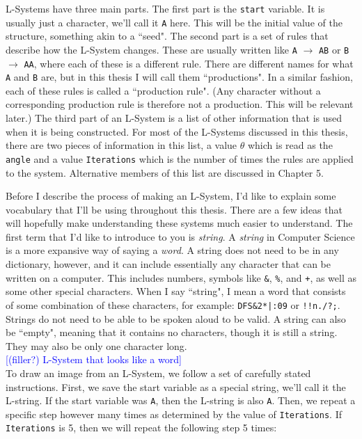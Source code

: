 \documentclass[12pt,twoside]{reedthesis}
\newcommand{\code}[1]{\texttt{#1}}
\begin{document}
	L-Systems have three main parts. The first part is the \code{start} variable. It is usually just a character, we'll call it \code{A} here. This will be the initial value of the structure, something akin to a ``seed". The second part is a set of rules that describe how the L-System changes. These are usually written like \code{A} $\rightarrow$ \code{AB} or \code{B} $\rightarrow$ \code{AA}, where each of these is a different rule. There are different names for what \code{A} and \code{B} are, but in this thesis I will call them ``productions". In a similar fashion, each of these rules is called a ``production rule". (Any character without a corresponding production rule is therefore not a production. This will be relevant later.) The third part of an L-System is a list of other information that is used when it is being constructed. For most of the L-Systems discussed in this thesis, there are two pieces of information in this list, a value $\theta$ which is read as the \code{angle} and a value \code{Iterations} which is the number of times the rules are applied to the system. Alternative members of this list are discussed in Chapter 5.

	Before I describe the process of making an L-System, I'd like to explain some vocabulary that I'll be using throughout this thesis. There are a few ideas that will hopefully make understanding these systems much easier to understand. The first term that I'd like to introduce to you is \textit{string}. A \textit{string} in Computer Science is a more expansive way of saying a \textit{word}. A string does not need to be in any dictionary, however, and it can include essentially any character that can be written on a computer. This includes numbers, symbols like \code{\&}, \code{\%}, and \code{+}, as well as some other special characters. When I say ``string", I mean a word that consists of some combination of these characters, for example: \code{DFS\&2*|:09} or \code{!!n./?;}. Strings do not need to be able to be spoken aloud to be valid. A string can also be ``empty", meaning that it contains no characters, though it is still a string. They may also be only one character long. \\
	
	\textcolor{blue}{[(filler?) L-System that looks like a word]}\\
	
	To draw an image from an L-System, we follow a set of carefully stated instructions. First, we save the start variable as a special string, we'll call it the L-string. If the start variable was \code{A}, then the L-string is also \code{A}. Then, we repeat a specific step however many times as determined by the value of \code{Iterations}. If \code{Iterations} is 5, then we will repeat the following step 5 times:\\
	
\end{document}
